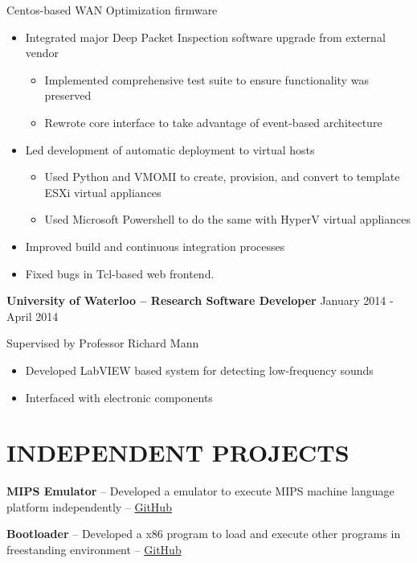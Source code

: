 \documentclass{res}
\begin{document}
\begin{resume}
         Centos-based WAN Optimization firmware
         \begin{itemize}
         \item Integrated major Deep Packet Inspection software upgrade from external vendor
           \begin{itemize}
           \item Implemented comprehensive test suite to ensure functionality was preserved
           \item Rewrote core interface to take advantage of event-based architecture
           \end{itemize}
         \item Led development of automatic deployment to virtual hosts
           \begin{itemize}
           \item Used Python and VMOMI to create, provision, and convert to template ESXi virtual appliances
           \item Used Microsoft Powershell to do the same with HyperV virtual appliances
           \end{itemize}
         \item Improved build and continuous integration processes
         \item Fixed bugs in Tcl-based web frontend.
         \end{itemize}
         {\bf University of Waterloo -- Research Software Developer} \hfill January 2014 - April 2014\vspace{-3mm}
 
         Supervised by Professor Richard Mann
         \begin{itemize}
         \item Developed LabVIEW based system for detecting low-frequency sounds
         \item Interfaced with electronic components
         \end{itemize}
 
\section{INDEPENDENT PROJECTS}
  \vspace{3mm}
    {\bf MIPS Emulator} -- Developed a emulator to execute MIPS machine language platform independently --
    \href{https://github.com/joelwilliamson/MIPS-emulator}{GitHub}
    \vspace{-3mm}

    {\bf Bootloader} -- Developed a x86 program to load and execute other programs in freestanding environment --
    \href{https://github.com/joelwilliamson/AMD64/tree/master/barebones}{GitHub}
    \vspace{-3mm}


\end{resume}
\end{document}
